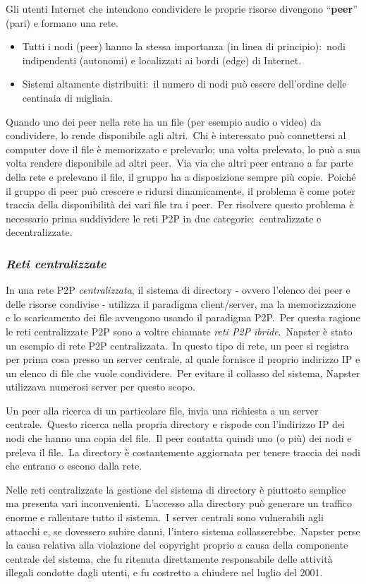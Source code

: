 Gli utenti Internet che intendono condividere le proprie risorse divengono ``\textbf{peer}'' (pari) e formano una rete.
\begin{itemize}
    \item Tutti i nodi (peer) hanno la stessa importanza (in linea di principio):\ nodi indipendenti (autonomi) e localizzati ai bordi (edge) di Internet.
    \item Sistemi altamente distribuiti:\ il numero di nodi può essere dell’ordine delle centinaia di migliaia.
\end{itemize}
Quando uno dei peer nella rete ha un file (per esempio audio o video) da condividere, lo rende disponibile agli altri.\
Chi è interessato può connettersi al computer dove il file è memorizzato e prelevarlo; una volta prelevato, lo può a sua volta rendere disponibile ad altri peer.\
Via via che altri peer entrano a far parte della rete e prelevano il file, il gruppo ha a disposizione sempre più copie.\
Poiché il gruppo di peer può crescere e ridursi dinamicamente, il problema è come poter traccia della disponibilità dei vari file tra i peer.\
Per risolvere questo problema è necessario prima suddividere le reti P2P in due categorie:\ centralizzate e decentralizzate.

\subsubsection{\emph{Reti centralizzate}}
In una rete P2P \emph{centralizzata}, il sistema di directory - ovvero l'elenco dei peer e delle risorse condivise - utilizza il paradigma client/server, ma la memorizzazione e lo scaricamento dei file avvengono usando il paradigma P2P.\
Per questa ragione le reti centralizzate P2P sono a voltre chiamate \emph{reti P2P ibride}.\
Napster è stato un esempio di rete P2P centralizzata.\
In questo tipo di rete, un peer si registra per prima cosa presso un server centrale, al quale fornisce il proprio indirizzo IP e un elenco di file che vuole condividere.\
Per evitare il collasso del sistema, Napster utilizzava numerosi server per questo scopo.

Un peer alla ricerca di un particolare file, invia una richiesta a un server centrale.\
Questo ricerca nella propria directory e rispode con l'indirizzo IP dei nodi che hanno una copia del file.\
Il peer contatta quindi uno (o più) dei nodi e preleva il file.\
La directory è costantemente aggiornata per tenere traccia dei nodi che entrano o escono dalla rete.

Nelle reti centralizzate la gestione del sistema di directory è piuttosto semplice ma presenta vari inconvenienti.\
L'accesso alla directory può generare un traffico enorme e rallentare tutto il sistema.\
I server centrali sono vulnerabili agli attacchi e, se dovessero subire danni, l'intero sistema collasserebbe.\
Napster perse la causa relativa alla violazione del copyright proprio a causa della componente centrale del sistema, che fu ritenuta direttamente responsabile delle attività illegali condotte dagli utenti, e fu costretto a chiudere nel luglio del 2001.

